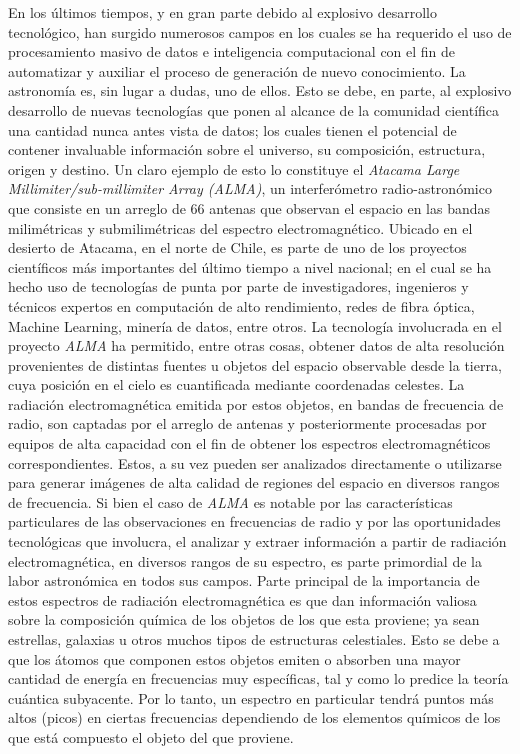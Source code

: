 \begin{intro}
En los últimos tiempos, y en gran parte debido al explosivo desarrollo tecnológico, han surgido numerosos campos en los cuales se ha requerido el uso de procesamiento masivo de datos e inteligencia computacional con el fin de automatizar y auxiliar el proceso de generación de nuevo conocimiento. La astronomía es, sin lugar a dudas, uno de ellos. Esto se debe, en parte, al explosivo desarrollo de nuevas tecnologías que ponen al alcance de la comunidad científica una cantidad nunca antes vista de datos; los cuales tienen el potencial de contener invaluable información sobre el universo, su composición, estructura, origen y destino.
Un claro ejemplo de esto lo constituye el \textit{Atacama Large Millimiter/sub-millimiter Array (ALMA)}\cite{almaobservatory.org}, un interferómetro radio-astronómico que consiste en un arreglo de 66 antenas que observan el espacio en las bandas milimétricas y submilimétricas del espectro electromagnético. Ubicado en el desierto de Atacama, en el norte de Chile, es parte de uno de los proyectos científicos más importantes del último tiempo a nivel nacional; en el cual se ha hecho uso de tecnologías de punta por parte de investigadores, ingenieros y técnicos expertos en computación de alto rendimiento, redes de fibra óptica, Machine Learning, minería de datos, entre otros. 
La tecnología involucrada en el proyecto \textit{ALMA} ha permitido, entre otras cosas, obtener datos de alta resolución provenientes de distintas fuentes u objetos del espacio observable desde la tierra, cuya posición en el cielo es cuantificada mediante coordenadas celestes. La radiación electromagnética emitida por estos objetos, en bandas de frecuencia de radio, son captadas por el arreglo de antenas y posteriormente procesadas por equipos de alta capacidad con el fin de obtener los espectros electromagnéticos correspondientes. Estos, a su vez pueden ser analizados directamente o utilizarse para generar imágenes de alta calidad de regiones del espacio en diversos rangos de frecuencia.
Si bien el caso de \textit{ALMA} es notable por las características particulares de las observaciones en frecuencias de radio y por las oportunidades tecnológicas que involucra, el analizar y extraer información a partir de radiación electromagnética, en diversos rangos de su espectro, es parte primordial de la labor astronómica en todos sus campos.
Parte principal de la importancia de estos espectros de radiación electromagnética es que dan información valiosa sobre la composición química de los objetos de los que esta proviene; ya sean estrellas, galaxias u otros muchos tipos de estructuras celestiales. Esto se debe a que los átomos que componen estos objetos emiten o absorben una mayor cantidad de energía en frecuencias muy específicas, tal y como lo predice la teoría cuántica subyacente. Por lo tanto, un espectro en particular tendrá puntos más altos (picos) en ciertas frecuencias dependiendo de los elementos químicos de los que está compuesto el objeto del que proviene. 

\end{intro}